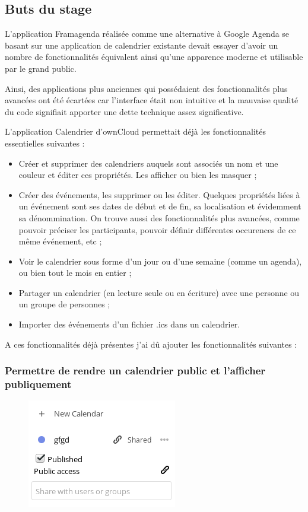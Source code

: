 \documentclass[10pt,a4paper]{report}
\begin{document}
	\subsection{Buts du stage}
	L'application Framagenda réalisée comme une alternative à Google Agenda se basant sur une application de calendrier existante devait essayer d'avoir un nombre de fonctionnalités équivalent ainsi qu'une apparence moderne et utilisable par le grand public.
	
	Ainsi, des applications plus anciennes qui possédaient des fonctionnalités plus avancées ont été écartées car l'interface était non intuitive et la mauvaise qualité du code signifiait apporter une dette technique assez significative.
	
	L'application Calendrier d'ownCloud permettait déjà les fonctionnalités essentielles suivantes :
	\begin{itemize}
		\item Créer et supprimer des calendriers auquels sont associés un nom et une couleur et éditer ces propriétés. Les afficher ou bien les masquer ;
		\item Créer des événements, les supprimer ou les éditer. Quelques propriétés liées à un événement sont ses dates de début et de fin, sa localisation et évidemment sa dénommination. On trouve aussi des fonctionnalités plus avancées, comme pouvoir préciser les participants, pouvoir définir différentes occurences de ce même événement, etc ;
		\item Voir le calendrier sous forme d'un jour ou d'une semaine (comme un agenda), ou bien tout le mois en entier ;
		\item Partager un calendrier (en lecture seule ou en écriture) avec une personne ou un groupe de personnes ;
		\item Importer des événements d'un fichier .ics dans un calendrier.
	\end{itemize}
	
	A ces fonctionnalités déjà présentes j'ai dû ajouter les fonctionnalités suivantes :
	
	\subsubsection{Permettre de rendre un calendrier public et l'afficher publiquement}
	
	\begin{figure}[ht]
		\includegraphics[width=0.25\paperwidth]{images/fonctionnalitepublie.png}
		\label{normal_case}
	\end{figure}
	
\end{document}
